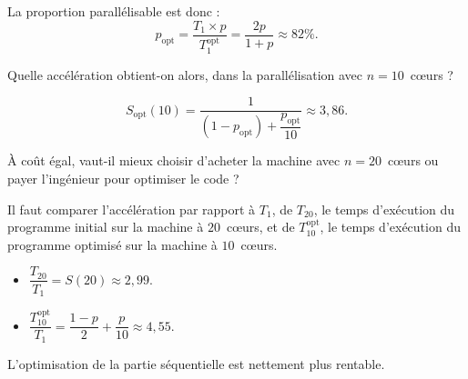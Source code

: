 \begin{exercice}
\begin{correction}
    La proportion parallélisable est donc :
    $$ p_{\mathrm{opt}} = \dfrac{T_1 \times p}{T_1^{\mathrm{opt}}} = \dfrac{2p}{1+p} \approx 82\%. $$
  \end{correction}
  
  \begin{question} 
  \item Quelle accélération obtient-on alors, dans la parallélisation avec $n = 10$~c\oe urs ?
  \end{question}
  \begin{correction}
    $$ S_{\mathrm{opt}}(10)=\dfrac{1}{(1-p_{\mathrm{opt}})+\dfrac{p_{\mathrm{opt}}}{10}} \approx 3,86. $$
  \end{correction}

  \begin{question} 
  \item À coût égal, vaut-il mieux choisir d'acheter la machine avec $n=20$~c\oe urs ou payer l'ingénieur pour optimiser le code ? 
  \end{question}
  \begin{correction}
    Il faut comparer l'accélération par rapport à $T_{1}$,
    de $T_{20}$, le temps d'exécution du programme initial sur la machine à $20$~c\oe urs,
    et de $T_{10}^{\mathrm{opt}}$, le temps d'exécution du programme optimisé sur la machine à $10$~c\oe urs.
    \begin{itemize}
    \item $\dfrac{T_{20}}{T_1} = S(20) \approx 2,99.$
    \item $\dfrac{T^{\mathrm{opt}}_{10}}{T_1} = \dfrac{1-p}{2} + \dfrac{p}{10} \approx 4,55.$
    \end{itemize}    

    L'optimisation de la partie séquentielle est nettement plus rentable.
  \end{correction}
  
\end{exercice}

\endgroup
\endinput
